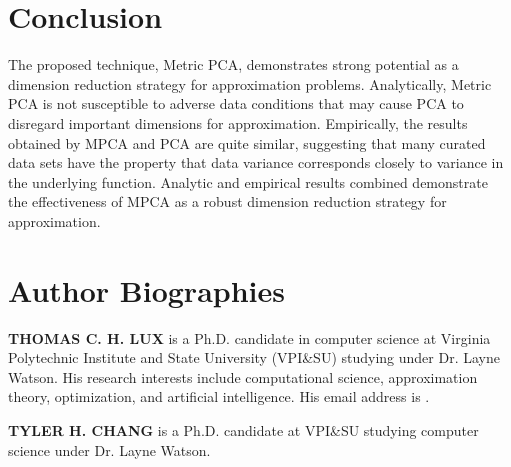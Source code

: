 \documentclass{scspaperproc}
\theoremstyle{scsthe}
\begin{document}
\section{Conclusion}
\label{sec:conclusion}

The proposed technique, Metric PCA, demonstrates strong potential as a
dimension reduction strategy for approximation problems. Analytically,
Metric PCA is not susceptible to adverse data conditions that may
cause PCA to disregard important dimensions for
approximation. Empirically, the results obtained by MPCA and PCA are
quite similar, suggesting that many curated data sets have the
property that data variance corresponds closely to variance
in the underlying function. Analytic and empirical results combined
demonstrate the effectiveness of MPCA as a robust dimension reduction
strategy for approximation.









\section*{Author Biographies}

\textbf{\uppercase{THOMAS C. H. LUX}} is a Ph.D. candidate in computer
science at Virginia Polytechnic Institute and State University
(VPI\&SU) studying under Dr. Layne Watson. His research interests
include computational science, approximation theory, optimization, and
artificial intelligence. His email address is .

\textbf{\uppercase{Tyler H. Chang}} is a Ph.D. candidate at VPI\&SU
studying computer science under Dr. Layne Watson.
\end{document}
